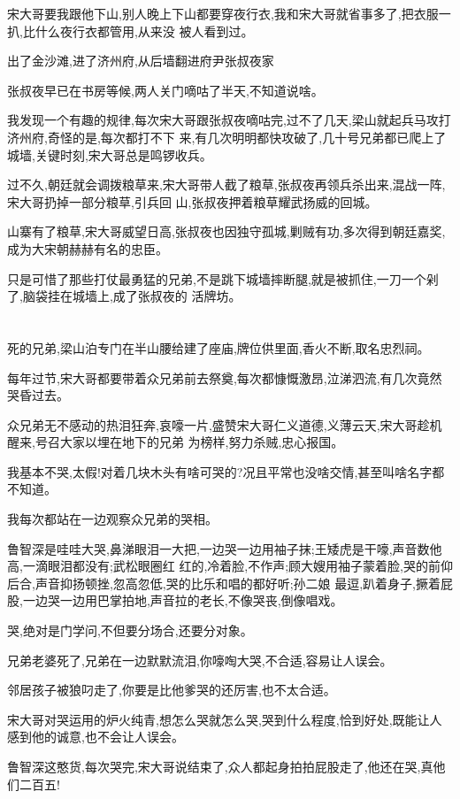 ﻿\documentclass[12pt]{article}
\begin{document}
宋大哥要我跟他下山,别人晚上下山都要穿夜行衣,我和宋大哥就省事多了,把衣服一扒,比什么夜行衣都管用,从来没
被人看到过。

出了金沙滩,进了济州府,从后墙翻进府尹张叔夜家

张叔夜早已在书房等候,两人关门嘀咕了半天,不知道说啥。

我发现一个有趣的规律,每次宋大哥跟张叔夜嘀咕完,过不了几天,梁山就起兵马攻打济州府,奇怪的是,每次都打不下
来,有几次明明都快攻破了,几十号兄弟都已爬上了城墙,关键时刻,宋大哥总是鸣锣收兵。

过不久,朝廷就会调拨粮草来,宋大哥带人截了粮草,张叔夜再领兵杀出来,混战一阵,宋大哥扔掉一部分粮草,引兵回
山,张叔夜押着粮草耀武扬威的回城。

山寨有了粮草,宋大哥威望日高,张叔夜也因独守孤城,剿贼有功,多次得到朝廷嘉奖,成为大宋朝赫赫有名的忠臣。

只是可惜了那些打仗最勇猛的兄弟,不是跳下城墙摔断腿,就是被抓住,一刀一个剁了,脑袋挂在城墙上,成了张叔夜的
活牌坊。
\section{}

死的兄弟,梁山泊专门在半山腰给建了座庙,牌位供里面,香火不断,取名忠烈祠。

每年过节,宋大哥都要带着众兄弟前去祭奠,每次都慷慨激昂,泣涕泗流,有几次竟然哭昏过去。

众兄弟无不感动的热泪狂奔,哀嚎一片,盛赞宋大哥仁义道德,义薄云天,宋大哥趁机醒来,号召大家以埋在地下的兄弟
为榜样,努力杀贼,忠心报国。

我基本不哭,太假!对着几块木头有啥可哭的?况且平常也没啥交情,甚至叫啥名字都不知道。

我每次都站在一边观察众兄弟的哭相。

鲁智深是哇哇大哭,鼻涕眼泪一大把,一边哭一边用袖子抹;王矮虎是干嚎,声音数他高,一滴眼泪都没有;武松眼圈红
红的,冷着脸,不作声;顾大嫂用袖子蒙着脸,哭的前仰后合,声音抑扬顿挫,忽高忽低,哭的比乐和唱的都好听;孙二娘
最逗,趴着身子,撅着屁股,一边哭一边用巴掌拍地,声音拉的老长,不像哭丧,倒像唱戏。

哭,绝对是门学问,不但要分场合,还要分对象。

兄弟老婆死了,兄弟在一边默默流泪,你嚎啕大哭,不合适,容易让人误会。

邻居孩子被狼叼走了,你要是比他爹哭的还厉害,也不太合适。

宋大哥对哭运用的炉火纯青,想怎么哭就怎么哭,哭到什么程度,恰到好处,既能让人感到他的诚意,也不会让人误会。

鲁智深这憨货,每次哭完,宋大哥说结束了,众人都起身拍拍屁股走了,他还在哭,真他们二百五!
\end{document}

